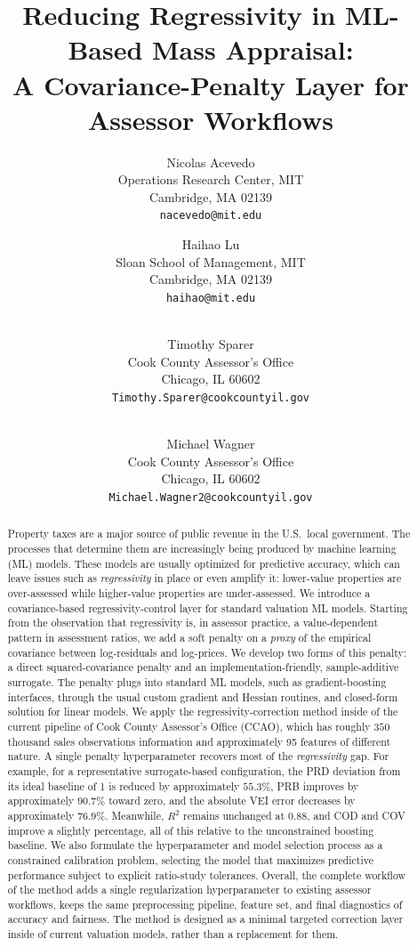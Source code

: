 \documentclass{article}
\title{\vspace{-5mm}Reducing Regressivity in ML-Based Mass Appraisal:\\ A Covariance-Penalty Layer for Assessor Workflows\vspace{0mm}}
\author{
    Nicolas Acevedo \\
    {\small Operations Research Center, MIT} \\
    {\small Cambridge, MA 02139} \\
    {\small \texttt{nacevedo@mit.edu}}
    \and
    Haihao Lu \\
    {\small Sloan School of Management, MIT} \\
    {\small Cambridge, MA 02139} \\
    {\small \texttt{haihao@mit.edu}}
    \and \vspace{3mm} \\ 
    Timothy Sparer \\
    {\small Cook County Assessor's Office} \\
    {\small Chicago, IL 60602} \\
    {\small \texttt{Timothy.Sparer@cookcountyil.gov}}
    \and \vspace{3mm} \\
    Michael Wagner \\
    {\small Cook County Assessor's Office} \\
    {\small Chicago, IL 60602} \\
    {\small \texttt{Michael.Wagner2@cookcountyil.gov}}
}
\date{
\vspace{-8mm}
}
\theoremstyle{plain}
\theoremstyle{definition}
\newcommand{\1}{\mathbf{1}}
\begin{document}
\maketitle

\begin{abstract}

Property taxes are a major source of public revenue in the U.S.\ local government. The processes that determine them are increasingly being produced by machine learning (ML) models. These models are usually optimized for predictive accuracy, which can leave issues such as \textit{regressivity} in place or even amplify it: lower-value properties are over-assessed while higher-value properties are under-assessed. We introduce a covariance-based regressivity-control layer for standard valuation ML models. Starting from the observation that regressivity is, in assessor practice, a value-dependent pattern in assessment ratios, we add a soft penalty on a \textit{proxy} of the empirical covariance between log-residuals and log-prices. We develop two forms of this penalty: a direct squared-covariance penalty and an implementation-friendly, sample-additive surrogate. The penalty plugs into standard ML models, such as gradient-boosting interfaces, through the usual custom gradient and Hessian routines, and closed-form solution for linear models. We apply the regressivity-correction method inside of the current pipeline of Cook County Assessor's Office (CCAO), which has roughly $350$ thousand sales observations information and approximately 95 features of different nature. A single penalty hyperparameter recovers most of the \textit{regressivity} gap. For example, for a representative surrogate-based configuration, the PRD deviation from its ideal baseline of 1 is reduced by approximately $55.3\%$, PRB improves by approximately $90.7\%$ toward zero, and the absolute VEI error decreases by approximately $76.9\%$. Meanwhile, $R^2$ remains unchanged at $0.88$, and COD and COV improve a slightly percentage, all of this relative to the unconstrained boosting baseline.
We also formulate the hyperparameter and model selection process as a constrained calibration problem, selecting the model that maximizes predictive performance subject to explicit ratio-study tolerances. Overall, the complete workflow of the method adds a single regularization hyperparameter to existing assessor workflows, keeps the same preprocessing pipeline, feature set, and final diagnostics of accuracy and fairness. The method is designed as a minimal targeted correction layer inside of current valuation models, rather than a replacement for them.

\end{abstract}
\end{document}
